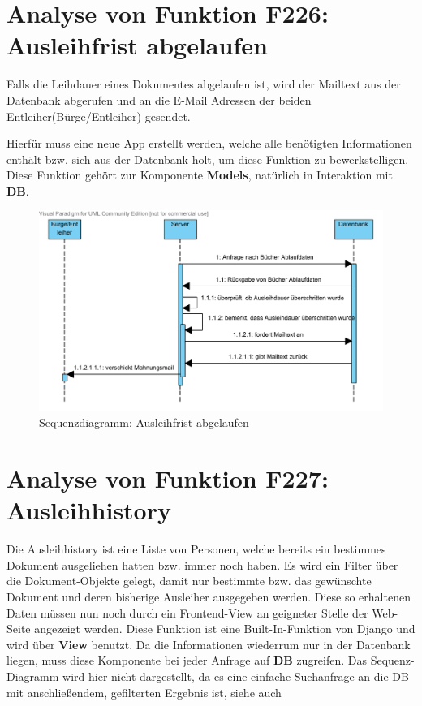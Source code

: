 \section{Analyse von Funktion F226: Ausleihfrist abgelaufen}
Falls die Leihdauer eines Dokumentes abgelaufen ist, wird der Mailtext aus der 
Datenbank abgerufen und an die E-Mail Adressen der beiden Entleiher(Bürge/Entleiher) gesendet.

Hierfür muss eine neue App erstellt werden, welche alle benötigten Informationen enthält bzw. sich aus der Datenbank holt, um diese Funktion zu bewerkstelligen.
Diese Funktion gehört zur Komponente \textbf{Models}, natürlich in Interaktion mit \textbf{DB}.
\begin{figure}
\includegraphics[width=0.8\linewidth]{bilder/SeqMail.pdf}
\caption{Sequenzdiagramm: Ausleihfrist abgelaufen}
\label{fig:226}
\end{figure}

\section{Analyse von Funktion F227: Ausleihhistory}
\label{f:227}
Die Ausleihhistory ist eine Liste von Personen, welche bereits ein bestimmes Dokument ausgeliehen hatten bzw. immer noch haben.
Es wird ein Filter über die Dokument-Objekte gelegt, damit nur bestimmte bzw. das gewünschte Dokument und deren bisherige Ausleiher ausgegeben werden. Diese so erhaltenen Daten müssen nun noch durch ein Frontend-View an geigneter Stelle der Web-Seite angezeigt werden.
Diese Funktion ist eine Built-In-Funktion von Django und wird über \textbf{View} benutzt. Da die Informationen wiederrum nur in der Datenbank liegen, muss diese Komponente bei jeder Anfrage auf \textbf{DB} zugreifen.
Das Sequenz-Diagramm wird hier nicht dargestellt, da es eine einfache Suchanfrage an die DB mit anschließendem, gefilterten Ergebnis ist, siehe auch 


